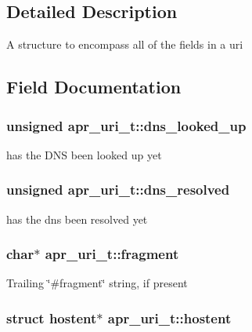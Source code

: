 \subsection{Detailed Description}
A structure to encompass all of the fields in a uri 

\subsection{Field Documentation}
\hypertarget{structapr__uri__t_ae28c03382cb6fcb226dfc76193699342}{
\subsubsection[{dns\-\_\-looked\-\_\-up}]{\setlength{\rightskip}{0pt plus 5cm}unsigned apr\-\_\-uri\-\_\-t\-::dns\-\_\-looked\-\_\-up}}\label{structapr__uri__t_ae28c03382cb6fcb226dfc76193699342}
has the D\-N\-S been looked up yet \hypertarget{structapr__uri__t_a805976fea6ef65f3ec1185c7d6dcf7f3}{
\subsubsection[{dns\-\_\-resolved}]{\setlength{\rightskip}{0pt plus 5cm}unsigned apr\-\_\-uri\-\_\-t\-::dns\-\_\-resolved}}\label{structapr__uri__t_a805976fea6ef65f3ec1185c7d6dcf7f3}
has the dns been resolved yet \hypertarget{structapr__uri__t_a0e4abeaa1379c79dcc6fdac01d76715a}{
\subsubsection[{fragment}]{\setlength{\rightskip}{0pt plus 5cm}char$\ast$ apr\-\_\-uri\-\_\-t\-::fragment}}\label{structapr__uri__t_a0e4abeaa1379c79dcc6fdac01d76715a}
Trailing \char`\"{}\#fragment\char`\"{} string, if present \hypertarget{structapr__uri__t_a2ec4edaa7288f3c1ebcb8cbca3d0379c}{
\subsubsection[{hostent}]{\setlength{\rightskip}{0pt plus 5cm}struct hostent$\ast$ apr\-\_\-uri\-\_\-t\-::hostent}}\label{structapr__uri__t_a2ec4edaa7288f3c1ebcb8cbca3d0379c}
